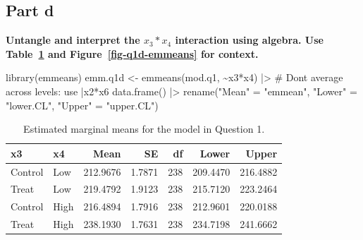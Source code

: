 \documentclass[
]{article}
\newenvironment{Shaded}{\begin{snugshade}}{\end{snugshade}}
\newcommand{\CommentTok}[1]{\textcolor[rgb]{0.37,0.37,0.37}{#1}}
\newcommand{\FunctionTok}[1]{\textcolor[rgb]{0.28,0.35,0.67}{#1}}
\newcommand{\NormalTok}[1]{\textcolor[rgb]{0.00,0.23,0.31}{#1}}
\newcommand{\OtherTok}[1]{\textcolor[rgb]{0.00,0.23,0.31}{#1}}
\newcommand{\SpecialCharTok}[1]{\textcolor[rgb]{0.37,0.37,0.37}{#1}}
\newcommand{\StringTok}[1]{\textcolor[rgb]{0.13,0.47,0.30}{#1}}
\begin{document}
\subsection{Part d}\label{part-d}

\textbf{Untangle and interpret the \(x_3*x_4\) interaction using
algebra. Use Table~\ref{tbl-q1d-emmeans} and
Figure~\ref{fig-q1d-emmeans} for context.}

\scriptsize

\begin{Shaded}
\begin{Highlighting}[numbers=left,,]
\FunctionTok{library}\NormalTok{(emmeans)}
\NormalTok{emm.q1d }\OtherTok{\textless{}{-}} \FunctionTok{emmeans}\NormalTok{(mod.q1, }\SpecialCharTok{\textasciitilde{}}\NormalTok{x3}\SpecialCharTok{*}\NormalTok{x4) }\SpecialCharTok{|\textgreater{}} \CommentTok{\# Don\textquotesingle{}t average across levels: use |x2*x6}
            \FunctionTok{data.frame}\NormalTok{() }\SpecialCharTok{|\textgreater{}}
            \FunctionTok{rename}\NormalTok{(}\StringTok{"Mean"}  \OtherTok{=} \StringTok{"emmean"}\NormalTok{,}
                   \StringTok{"Lower"} \OtherTok{=} \StringTok{"lower.CL"}\NormalTok{,}
                   \StringTok{"Upper"} \OtherTok{=} \StringTok{"upper.CL"}\NormalTok{)}
\end{Highlighting}
\end{Shaded}

\normalsize

\normalsize

{

\begin{longtable}[]{@{}llrrrrr@{}}

\caption{\label{tbl-q1d-emmeans}Estimated marginal means for the model
in Question 1.}

\tabularnewline

\toprule\noalign{}
x3 & x4 & Mean & SE & df & Lower & Upper \\
\midrule\noalign{}
\endhead
\bottomrule\noalign{}
\endlastfoot
Control & Low & 212.9676 & 1.7871 & 238 & 209.4470 & 216.4882 \\
Treat & Low & 219.4792 & 1.9123 & 238 & 215.7120 & 223.2464 \\
Control & High & 216.4894 & 1.7916 & 238 & 212.9601 & 220.0188 \\
Treat & High & 238.1930 & 1.7631 & 238 & 234.7198 & 241.6662 \\

\end{longtable}

}
\end{document}

